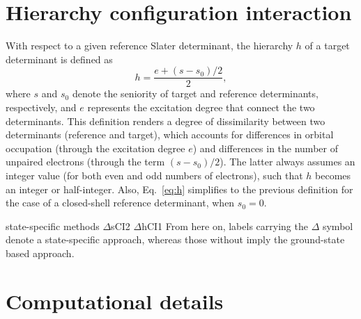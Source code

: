 \documentclass[aip,jcp,reprint,noshowkeys,superscriptaddress]{revtex4-1}
\begin{document}
\section{Hierarchy configuration interaction}
\label{sec:hCI}

With respect to a given reference Slater determinant, the hierarchy $h$ of a target determinant is defined as
\begin{equation}
        \label{eq:h}
	h = \frac{e+ (s-s_0)/2}{2},
\end{equation}
where $s$ and $s_0$ denote the seniority of target and reference determinants, respectively, and $e$ represents the excitation degree that connect the two determinants.
This definition renders a degree of dissimilarity between two determinants (reference and target),
which accounts for differences in orbital occupation (through the excitation degree $e$)
and differences in the number of unpaired electrons (through the term $(s-s_0)/2$).
The latter always assumes an integer value (for both even and odd numbers of electrons), such that $h$ becomes an integer or half-integer.
Also, Eq.~\eqref{eq:h} simplifies to the previous definition \cite{Kossoski_2022} for the case of a closed-shell reference determinant, when $s_0 = 0$.

state-specific methods
$\Delta$sCI2 
$\Delta$hCI1
From here on, labels carrying the $\Delta$ symbol denote a state-specific approach,
whereas those without imply the ground-state based approach.


\section{Computational details}
\label{sec:compdet}
\end{document}
